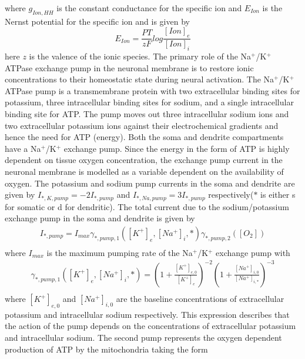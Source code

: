 \documentclass[fleqn]{report}
\numberwithin{equation}{section}
\numberwithin{equation}{section}
\begin{document}
				where $g_{Ion,HH}$ is the constant conductance for the specific ion and $E_{Ion}$ is the Nernst potential for the specific ion and is given by 
				\begin{equation} %
				E_{Ion}=\frac{PT}{zF}log\frac{[Ion]_e}{[Ion]_i}
				\end{equation}
				here $z$ is the valence of the ionic species. The primary role of the Na${^+}$/K${^+}$ ATPase exchange pump in the neuronal membrane is to restore ionic concentrations to their homeostatic state during neural activation. The Na${^+}$/K${^+}$ ATPase pump is a transmembrane protein with two extracellular binding sites for potassium, three intracellular binding sites for sodium, and a single intracellular binding site for ATP.  The pump moves out three intracellular sodium ions and two extracellular potassium ions against their electrochemical gradients and hence the need for ATP (energy). Both the soma and dendrite compartments have a Na${^+}$/K${^+}$ exchange pump. Since the energy in the form of ATP is highly dependent on tissue oxygen concentration, the exchange pump current in the neuronal membrane is modelled as a variable dependent on the availability of oxygen. The potassium and sodium pump currents in the soma and dendrite are given by $I_{*,K,pump}=-2I_{*,pump}$ and $I_{*,Na,pump}=3I_{*,pump}$ respectively($*$ is either s for somatic or d for dendritic). The total current due to the sodium/potassium exchange pump in the soma and dendrite is given by
				\begin{equation} %
				\begin{aligned}
				I_{*,pump}=I_{max}\gamma_{*,pump,1}([K^+]_e,[Na^+]_i,*)\gamma_{*,pump,2}([O_2])\\
				\end{aligned}
				\end{equation}
				where $I_{max}$ is the maximum pumping rate of the Na${^+}$/K${^+}$ exchange pump with
				\begin{equation} \label{eq:Math_pump1}
				\begin{aligned}
				\gamma_{*,pump,1}([K^+]_e,[Na^+]_i,*)=\left(1+\frac{[K^+]_{e,0}}{[K^+]_e}\right)^{-2}\left(1+\frac{[Na^+]_{i,0}}{[Na^+]_{i,*}}\right)^{-3}\\
				\end{aligned}
				\end{equation}
				where $[K^+]_{e,0}$ and $[Na^+]_{i,0}$ are the baseline concentrations of extracellular potassium and intracellular sodium respectively. This expression describes that the action of the pump depends on the concentrations of extracellular potassium and intracellular sodium. The second pump represents the oxygen dependent production of ATP by the mitochondria\citep{Cloutier2009,Heinrich1996} taking the form
\end{document}
